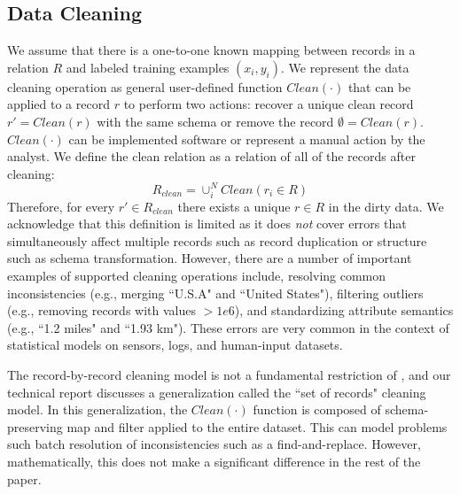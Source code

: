 \subsection{Data Cleaning}
We assume that there is a one-to-one known mapping between records in a relation $R$ and labeled training examples $(x_{i},y_{i})$.
We represent the data cleaning operation as general user-defined function $Clean(\cdot)$ that can be applied to a record $r$ to perform two actions: recover a unique clean record $r' = Clean(r)$ with the same schema or remove the record $\emptyset = Clean(r)$.
$Clean(\cdot)$ can be implemented software or represent a manual action by the analyst.
We define the clean relation as a relation of all of the records after cleaning:
\[R_{clean} = \cup_i^N Clean(r_i \in R)\]
Therefore, for every $r' \in R_{clean}$ there exists a unique $r \in R$ in the dirty data.
We acknowledge that this definition is limited as it does \emph{not} cover errors that simultaneously affect multiple records such as record duplication or structure such as schema transformation.
However, there are a number of important examples of supported cleaning operations include, resolving common inconsistencies (e.g., merging ``U.S.A" and ``United States"), filtering outliers (e.g., removing records with values $>1e6$), and standardizing attribute semantics (e.g., ``1.2 miles" and ``1.93 km").
These errors are very common in the context of statistical models on sensors, logs, and human-input datasets. 

The record-by-record cleaning model is not a fundamental restriction of \sys, and our technical report discusses a generalization called the ``set of records" cleaning model.
In this generalization, the $Clean(\cdot)$ function is composed of schema-preserving \textsf{map} and \textsf{filter} applied to the entire dataset.
This can model problems such batch resolution of inconsistencies such as a find-and-replace.
However, mathematically, this does not make a significant difference in the rest of the paper.

